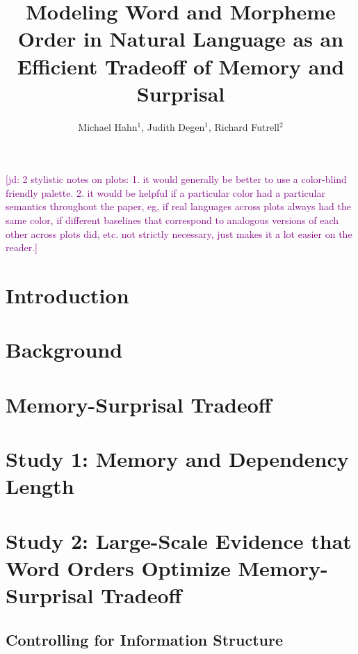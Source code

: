 \documentclass[man]{apa7}
\title{Modeling Word and Morpheme Order in Natural Language as an Efficient Tradeoff of Memory and Surprisal}
\author{Michael Hahn$^1$, Judith Degen$^1$, Richard Futrell$^2$}
\affiliation{$^1$ Stanford University, $^2$ University of California, Irvine}
\newcommand{\jd}[1]{\textcolor{Purple}{[jd: #1]}}
\begin{document}
\maketitle
\jd{2 stylistic notes on plots: 1. it would generally be better to use a color-blind friendly palette. 2. it would be helpful if a particular color had a particular semantics throughout the paper, eg, if real languages across plots always had the same color, if different baselines that correspond to analogous versions of each other across plots did, etc. not strictly necessary, just makes it a lot easier on the reader.}


\section{Introduction}



\section{Background}\label{sec:background}





\section{Memory-Surprisal Tradeoff}\label{sec:ms-tradeoff}



\section{Study 1: Memory and Dependency Length}\label{sec:toy-study}





\section{Study 2: Large-Scale Evidence that Word Orders Optimize Memory-Surprisal Tradeoff}
\label{sec:main-experiment}



\subsection{Controlling for Information Structure}\label{subsec:freedom}


\end{document}
